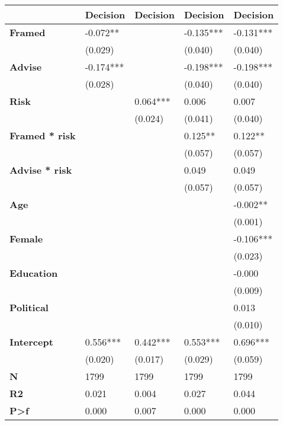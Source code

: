\begin{tabular}{lllll}
\toprule
{} &   Decision &  Decision &   Decision &   Decision \\
\midrule
\textbf{Framed       } &   -0.072** &           &  -0.135*** &  -0.131*** \\
              &    (0.029) &           &    (0.040) &    (0.040) \\
\textbf{Advise       } &  -0.174*** &           &  -0.198*** &  -0.198*** \\
              &    (0.028) &           &    (0.040) &    (0.040) \\
\textbf{Risk         } &            &  0.064*** &      0.006 &      0.007 \\
              &            &   (0.024) &    (0.041) &    (0.040) \\
\textbf{Framed * risk} &            &           &    0.125** &    0.122** \\
              &            &           &    (0.057) &    (0.057) \\
\textbf{Advise * risk} &            &           &      0.049 &      0.049 \\
              &            &           &    (0.057) &    (0.057) \\
\textbf{Age          } &            &           &            &   -0.002** \\
              &            &           &            &    (0.001) \\
\textbf{Female       } &            &           &            &  -0.106*** \\
              &            &           &            &    (0.023) \\
\textbf{Education    } &            &           &            &     -0.000 \\
              &            &           &            &    (0.009) \\
\textbf{Political    } &            &           &            &      0.013 \\
              &            &           &            &    (0.010) \\
\textbf{Intercept    } &   0.556*** &  0.442*** &   0.553*** &   0.696*** \\
              &    (0.020) &   (0.017) &    (0.029) &    (0.059) \\
\textbf{N            } &       1799 &      1799 &       1799 &       1799 \\
\textbf{R2           } &      0.021 &     0.004 &      0.027 &      0.044 \\
\textbf{P>f          } &      0.000 &     0.007 &      0.000 &      0.000 \\
\bottomrule
\end{tabular}
